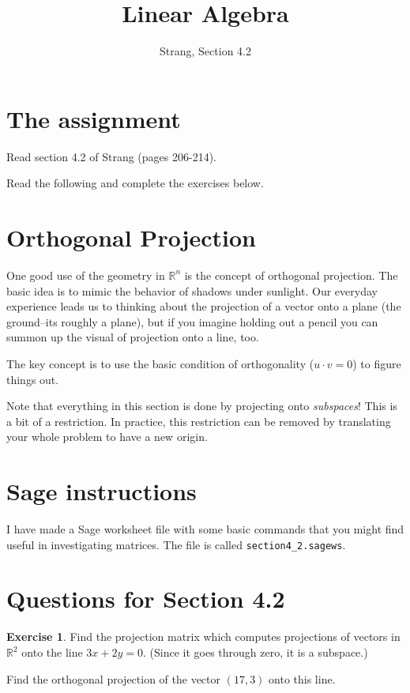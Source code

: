 \documentclass[11pt]{amsart}
\theoremstyle{definition}
\newtheorem{exercise}{Exercise}
\begin{document}
\title{Linear Algebra}
\author{Strang, Section 4.2}
\maketitle

\section{The assignment}
\begin{compactitem}
\item Read section 4.2 of Strang (pages 206-214).
\item Read the following and complete the exercises below.
\end{compactitem}


\section{Orthogonal Projection}

One good use of the geometry in $\mathbb{R}^n$ is the concept of orthogonal projection. The basic idea is to mimic the behavior of shadows under sunlight. Our everyday experience leads us to thinking about the projection of a vector onto a plane (the ground--its roughly a plane), but if you imagine holding out a pencil you can summon up the visual of projection onto a line, too.

The key concept is to use the basic condition of orthogonality ($u \cdot v = 0$) to figure things out.

Note that everything in this section is done by projecting onto \emph{subspaces}! This is a bit of a restriction. In practice, this restriction can be removed by translating your whole problem to have a new origin.

\section{Sage instructions}

I have made a Sage worksheet file with some basic commands that you might find useful in investigating matrices. The file is called \texttt{section4\_2.sagews}.


\section{Questions for Section 4.2}
\setcounter{exercise}{122}

\begin{exercise} Find the projection matrix which computes projections of vectors in $\mathbb{R}^2$ onto the line $3x+2y=0$. (Since it goes through zero, it is a subspace.)

Find the orthogonal projection of the vector $\left( 17,3 \right)$ onto this line.
\end{exercise}
\end{document}

